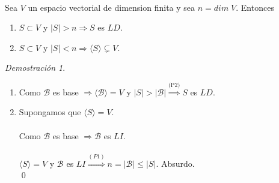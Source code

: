 \documentclass{article}
\theoremstyle{definition}
\theoremstyle{definition}
\theoremstyle{remark}
\newtheorem*{demo}{Demostración}
\begin{document}
                        \begin{corol} \; \\
                          Sea $V$ un espacio vectorial de dimension finita y sea $n=dim\; V$. Entonces \begin{enumerate}[label=(\arabic*)]
                            \item $S \subset V$ y $|S| > n \Rightarrow S$ es $LD$.
                            \item $S \subset V$ y $|S| < n \Rightarrow \langle S \rangle \subsetneq V$.
                          \end{enumerate}
                        \end{corol}
                        \begin{demo} \;
                          \begin{enumerate}[label=(\arabic*)]
                          \item Como $\mathcal{B}$ es base $\Rightarrow \langle \mathcal{B}\rangle = V$ y $|S| > |\mathcal{B}| \overset{\text{(P2)}}{\Rightarrow} S $ es $LD$.          
                          \item Supongamos que $\langle S \rangle = V$. \\\\ Como $\mathcal{B}$ es base $\Rightarrow \mathcal{B}$ es $LI$. \\\\ $\langle S \rangle = V$ y $\mathcal{B}$ es $LI \overset{(P1)}{\Rightarrow} n = |\mathcal{B}| \leq |S|$. Absurdo. \\ \qed 
      \end{enumerate}
                        \end{demo}
\pagebreak
\end{document}
